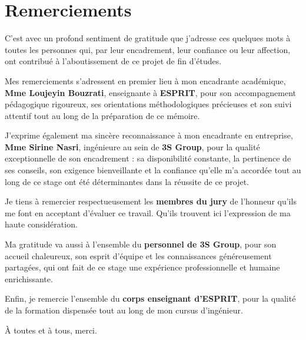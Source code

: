\documentclass[12pt,a4paper]{report}
\begin{document}
\chapter*{Remerciements}
\thispagestyle{empty}

C'est avec un profond sentiment de gratitude que j'adresse ces quelques mots à toutes les personnes qui, par leur encadrement, leur confiance ou leur affection, ont contribué à l'aboutissement de ce projet de fin d'études.

Mes remerciements s'adressent en premier lieu à mon encadrante académique, \textbf{Mme Loujeyin Bouzrati}, enseignante à \textbf{ESPRIT}, pour son accompagnement pédagogique rigoureux, ses orientations méthodologiques précieuses et son suivi attentif tout au long de la préparation de ce mémoire.

J'exprime également ma sincère reconnaissance à mon encadrante en entreprise, \textbf{Mme Sirine Nasri}, ingénieure au sein de \textbf{3S Group}, pour la qualité exceptionnelle de son encadrement : sa disponibilité constante, la pertinence de ses conseils, son exigence bienveillante et la confiance qu'elle m'a accordée tout au long de ce stage ont été déterminantes dans la réussite de ce projet.

Je tiens à remercier respectueusement les \textbf{membres du jury} de l'honneur qu'ils me font en acceptant d'évaluer ce travail. Qu'ils trouvent ici l'expression de ma haute considération.

Ma gratitude va aussi à l'ensemble du \textbf{personnel de 3S Group}, pour son accueil chaleureux, son esprit d'équipe et les connaissances généreusement partagées, qui ont fait de ce stage une expérience professionnelle et humaine enrichissante.

Enfin, je remercie l'ensemble du \textbf{corps enseignant d'ESPRIT}, pour la qualité de la formation dispensée tout au long de mon cursus d'ingénieur.

À toutes et à tous, merci.
\newpage

\tableofcontents
\thispagestyle{empty}
\newpage

\listoffigures
\thispagestyle{empty}
\newpage

\listoftables
\thispagestyle{empty}
\newpage
\end{document}
